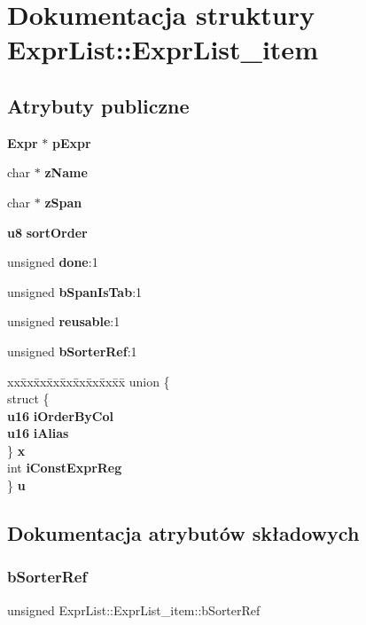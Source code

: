 \section{Dokumentacja struktury Expr\+List\+::Expr\+List\+\_\+item}
\label{struct_expr_list_1_1_expr_list__item}
\subsection*{Atrybuty publiczne}
\begin{DoxyCompactItemize}
\item 
\textbf{ Expr} $\ast$ \textbf{ p\+Expr}
\item 
char $\ast$ \textbf{ z\+Name}
\item 
char $\ast$ \textbf{ z\+Span}
\item 
\textbf{ u8} \textbf{ sort\+Order}
\item 
unsigned \textbf{ done}\+:1
\item 
unsigned \textbf{ b\+Span\+Is\+Tab}\+:1
\item 
unsigned \textbf{ reusable}\+:1
\item 
unsigned \textbf{ b\+Sorter\+Ref}\+:1
\item 
\begin{tabbing}
xx\=xx\=xx\=xx\=xx\=xx\=xx\=xx\=xx\=\kill
union \{\\
\>struct \{\\
\>\>\textbf{ u16} \textbf{ iOrderByCol}\\
\>\>\textbf{ u16} \textbf{ iAlias}\\
\>\} \textbf{ x}\\
\>int \textbf{ iConstExprReg}\\
\} \textbf{ u}\\

\end{tabbing}\end{DoxyCompactItemize}


\subsection{Dokumentacja atrybutów składowych}
\mbox{\label{struct_expr_list_1_1_expr_list__item_adbcfef143e4f1de08ebc8ff7d38e6619}} 
\subsubsection{bSorterRef}
{\footnotesize\ttfamily unsigned Expr\+List\+::\+Expr\+List\+\_\+item\+::b\+Sorter\+Ref}


